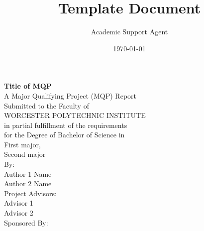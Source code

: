 \documentclass{article}
\title{Template Document}
\author{Academic Support Agent}
\date{\today}
\begin{document}
\maketitle



\begin{center}
    \Huge{\textbf{Title of MQP}} \\ %
    \vspace{10mm} %
    \large{
    A Major Qualifying Project (MQP) Report \\
    Submitted to the Faculty of \\
    WORCESTER POLYTECHNIC INSTITUTE \\
    in partial fulfillment of the requirements \\
    for the Degree of Bachelor of Science in \\
    } %
    \Large{
    \vspace{5mm} %
    First major, \\ %
    Second major \\ %
    \vspace{10mm} %
    By: \\
    \vspace{5mm} %
    Author 1 Name \\ %
    Author 2 Name \\ %
    \vspace {15mm} %
    Project Advisors: \\ %
    \vspace{5mm} %
    Advisor 1 \\ %
    Advisor 2 \\  %
    \vspace {15mm} %
    Sponsored By: \\ 
}
\end{center}
\end{document}
